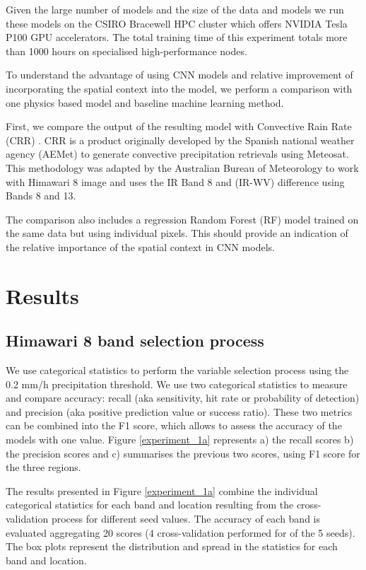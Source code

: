 \documentclass[3p,times]{elsarticle}
\begin{document}
Given the large number of models and the size of the data and models we run these models on the CSIRO Bracewell HPC cluster which offers NVIDIA Tesla P100 GPU accelerators. The total training time of this experiment totals more than 1000 hours on specialised high-performance nodes.

To understand the advantage of using CNN models and relative improvement of incorporating the spatial context into the model, we perform a comparison with one physics based model and baseline machine learning method.

First, we compare the output of the resulting model with Convective Rain Rate (CRR) \citep{aemetsaf2013}. CRR is a product originally developed by the Spanish national weather agency (AEMet) to generate convective precipitation retrievals using Meteosat. This methodology was adapted by the Australian Bureau of Meteorology to work with Himawari 8 image and uses the IR Band 8 and (IR-WV) difference using Bands 8 and 13.

The comparison also includes a regression Random Forest (RF) model \citep{breiman2001random} trained on the same data but using individual pixels. This should provide an indication of the relative importance of the spatial context in CNN models.


\section{Results}

\subsection{Himawari 8 band selection process}

We use categorical statistics to perform the variable selection process using the 0.2 mm/h precipitation threshold. We use two categorical statistics to measure and compare accuracy: recall (aka sensitivity, hit rate or probability of detection) and precision (aka positive prediction value or success ratio). These two metrics can be combined into the F1 score, which allows to assess the accuracy of the models with one value. Figure \ref{experiment_1a} represents a) the recall scores b) the precision scores and c) summarises the previous two scores, using F1 score for the three regions.

The results presented in Figure \ref{experiment_1a} combine the individual categorical statistics for each band and location resulting from the cross-validation process for different seed values. The accuracy of each band is evaluated aggregating 20 scores (4 cross-validation performed for of the 5 seeds). The box plots represent the distribution and spread in the statistics for each band and location. %
\end{document}
